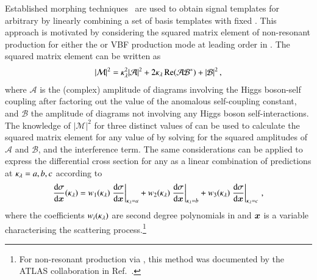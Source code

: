 Established morphing techniques~\cite{ATL-PHYS-PUB-2015-047} are used
to obtain signal templates for arbitrary \klambda by linearly
combining a set of basis templates with fixed \klambda. This approach
is motivated by considering the squared matrix element of non-resonant
\HH production for either the \ggF or VBF production mode at leading
order in \klambda. The squared matrix element can be written as
\begin{align*}
  |\mathcal{M}|^2 = \kappa_{\lambda}^2 |\mathcal{A}|^2 + 2 \kappa_{\lambda} \operatorname{Re}(\mathcal{A} \mathcal{B}^*) + |\mathcal{B}|^2 \,\text{,}
\end{align*}
where $\mathcal{A}$ is the (complex) amplitude of diagrams involving
the Higgs boson-self coupling after factoring out the value of the
anomalous self-coupling constant, and $\mathcal{B}$ the amplitude of
diagrams not involving any Higgs boson self-interactions. The
knowledge of $|\mathcal{M}|^2$ for three distinct values of \klambda
can be used to calculate the squared matrix element for any value of
\klambda by solving for the squared amplitudes of $\mathcal{A}$ and
$\mathcal{B}$, and the interference term. The same considerations can
be applied to express the differential cross section for any \klambda
as a linear combination of predictions at $\kappa_{\lambda} = a, b, c$
according to
\begin{align*}
  \frac{\mathrm{d}\sigma}{\mathrm{d}\bm{x}}(\kappa_{\lambda})
  = w_1(\kappa_{\lambda}) \left. \frac{\mathrm{d}\sigma}{\mathrm{d}\bm{x}} \right|_{\kappa_{\lambda} = a}
  + w_2(\kappa_{\lambda}) \left. \frac{\mathrm{d}\sigma}{\mathrm{d}\bm{x}} \right|_{\kappa_{\lambda} = b}
  + w_3(\kappa_{\lambda}) \left. \frac{\mathrm{d}\sigma}{\mathrm{d}\bm{x}} \right|_{\kappa_{\lambda} = c} \,\text{,}
\end{align*}
where the coefficients $w_i(\kappa_{\lambda})$ are second degree polynomials in \klambda
and $\bm{x}$ is a variable characterising the scattering
process.\footnote{For non-resonant \HH production via \ggF, this method was
  documented by the ATLAS collaboration in Ref.~\cite{ATL-PHYS-PUB-2019-007}.}

